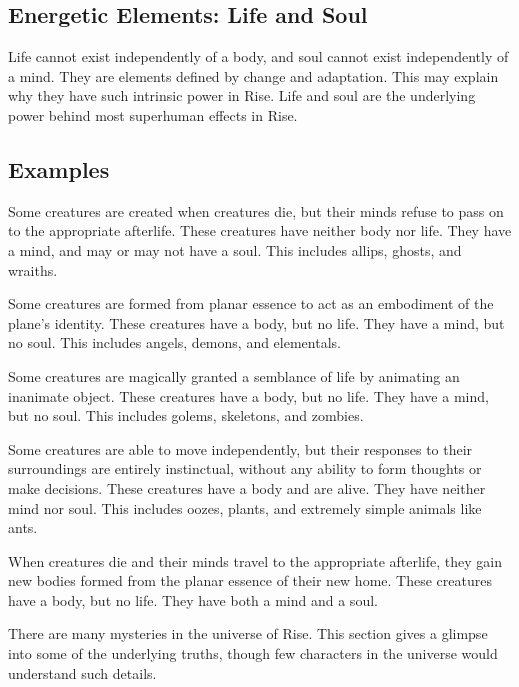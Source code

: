   \subsection{Energetic Elements: Life and Soul}
    Life cannot exist independently of a body, and soul cannot exist independently of a mind.
    They are elements defined by change and adaptation.
    This may explain why they have such intrinsic power in Rise.
    Life and soul are the underlying power behind most superhuman effects in Rise.

  \subsection{Examples}
    \begin{raggeditemize}
      \item Some creatures are created when creatures die, but their minds refuse to pass on to the appropriate afterlife. These creatures have neither body nor life. They have a mind, and may or may not have a soul. This includes allips, ghosts, and wraiths.
      \item Some creatures are formed from planar essence to act as an embodiment of the plane's identity. These creatures have a body, but no life. They have a mind, but no soul. This includes angels, demons, and elementals.
      \item Some creatures are magically granted a semblance of life by animating an inanimate object. These creatures have a body, but no life. They have a mind, but no soul. This includes golems, skeletons, and zombies.
      \item Some creatures are able to move independently, but their responses to their surroundings are entirely instinctual, without any ability to form thoughts or make decisions. These creatures have a body and are alive. They have neither mind nor soul. This includes oozes, plants, and extremely simple animals like ants.
      \item When creatures die and their minds travel to the appropriate afterlife, they gain new bodies formed from the planar essence of their new home. These creatures have a body, but no life. They have both a mind and a soul.
    \end{raggeditemize}


  There are many mysteries in the universe of Rise.
  This section gives a glimpse into some of the underlying truths, though few characters in the universe would understand such details.

